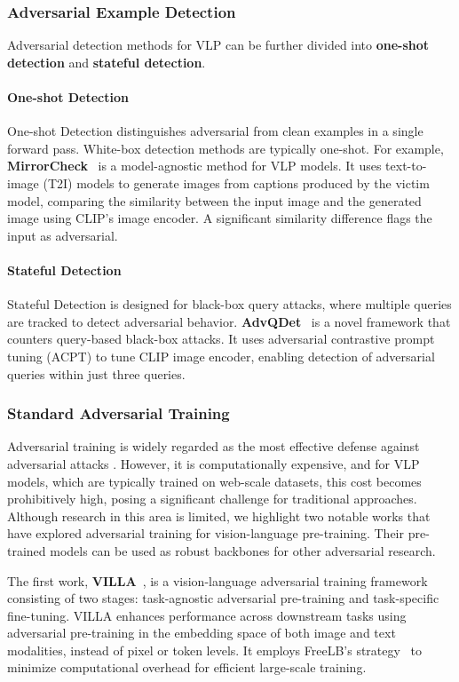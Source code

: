 \subsubsection{Adversarial Example Detection}
Adversarial detection methods for VLP can be further divided into \textbf{one-shot detection} and \textbf{stateful detection}.

\paragraph{One-shot Detection} 
One-shot Detection distinguishes adversarial from clean examples in a single forward pass. White-box detection methods are typically one-shot. For example, \textbf{MirrorCheck}~\cite{fares2024mirrorcheck} is a model-agnostic method for VLP models. It uses text-to-image (T2I) models to generate images from captions produced by the victim model, comparing the similarity between the input image and the generated image using CLIP’s image encoder. A significant similarity difference flags the input as adversarial.


\paragraph{Stateful Detection} Stateful Detection is designed for black-box query attacks, where multiple queries are tracked to detect adversarial behavior. \textbf{AdvQDet}~\cite{wang2024advqdet} is a novel framework that counters query-based black-box attacks. It uses adversarial contrastive prompt tuning (ACPT) to tune CLIP image encoder, enabling detection of adversarial queries within just three queries.


\subsubsection{Standard Adversarial Training}
Adversarial training is widely regarded as the most effective defense against adversarial attacks \cite{madry2017towards,croce2020reliable}. However, it is computationally expensive, and for VLP models, which are typically trained on web-scale datasets, this cost becomes prohibitively high, posing a significant challenge for traditional approaches. Although research in this area is limited, we highlight two notable works that have explored adversarial training for vision-language pre-training. Their pre-trained models can be used as robust backbones for other adversarial research.

The first work, \textbf{VILLA}~\cite{gan2020large}, is a vision-language adversarial training framework consisting of two stages: task-agnostic adversarial pre-training and task-specific fine-tuning. VILLA enhances performance across downstream tasks using adversarial pre-training in the embedding space of both image and text modalities, instead of pixel or token levels. It employs FreeLB’s strategy~\cite{zhu2019freelb} to minimize computational overhead for efficient large-scale training.

